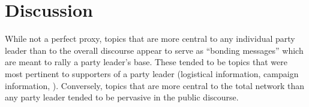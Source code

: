 
\section{Discussion}

While not a perfect proxy, topics that are more central to any individual party
leader than to the overall discourse appear to serve as ``bonding messages''
which are meant to rally a party leader's base. These tended to be topics that
were most pertinent to supporters of a party leader (logistical information,
campaign information, \etc). Conversely, topics that are more central to the
total network than any party leader tended to be pervasive in the public
discourse. 





\label{lastpage}




